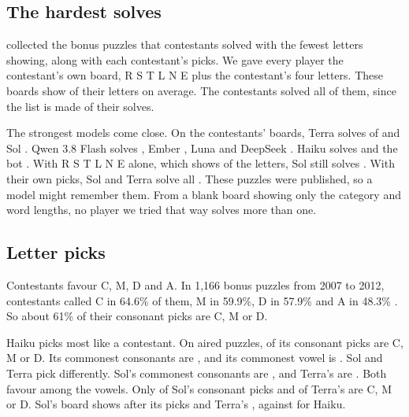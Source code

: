 \subsection{The hardest solves}

\citet{blatt2014} collected the \BlattPuzzles{} bonus puzzles that contestants solved with the fewest letters showing, along with each contestant's picks. We gave every player the contestant's own board, R S T L N E plus the contestant's four letters. These boards show \BlattShownContestant{} of their letters on average. The contestants solved all of them, since the list is made of their solves.

The strongest models come close. On the contestants' boards, Terra solves \BlattTerraContestant{} of \BlattPuzzles{} and Sol \BlattSolContestant. Qwen 3.8 Flash solves \BlattQwenContestant, Ember \BlattEmberContestant, Luna \BlattLunaContestant{} and DeepSeek \BlattDeepSeekContestant. Haiku solves \BlattHaikuContestant{} and the bot \BlattBotContestant. With R S T L N E alone, which shows \BlattShownRstlne{} of the letters, Sol still solves \BlattSolRstlne. With their own picks, Sol and Terra solve all \BlattPuzzles. These puzzles were published, so a model might remember them. From a blank board showing only the category and word lengths, no player we tried that way solves more than one.

\subsection{Letter picks}

Contestants favour C, M, D and A. In 1,166 bonus puzzles from 2007 to 2012, contestants called C in 64.6\% of them, M in 59.9\%, D in 57.9\% and A in 48.3\% \citep{spaniel2013}. So about 61\% of their consonant picks are C, M or D.

Haiku picks most like a contestant. On aired puzzles, \AiredBonusHaikuFavourites{} of its consonant picks are C, M or D. Its commonest consonants are \AiredBonusHaikuPicks, and its commonest vowel is \AiredBonusHaikuVowel. Sol and Terra pick differently. Sol's commonest consonants are \AiredBonusSolPicks, and Terra's are \AiredBonusTerraPicks. Both favour \AiredBonusSolVowel{} among the vowels. Only \AiredBonusSolFavourites{} of Sol's consonant picks and \AiredBonusTerraFavourites{} of Terra's are C, M or D. Sol's board shows \AiredBonusSolShown{} after its picks and Terra's \AiredBonusTerraShown, against \AiredBonusHaikuShown{} for Haiku.

